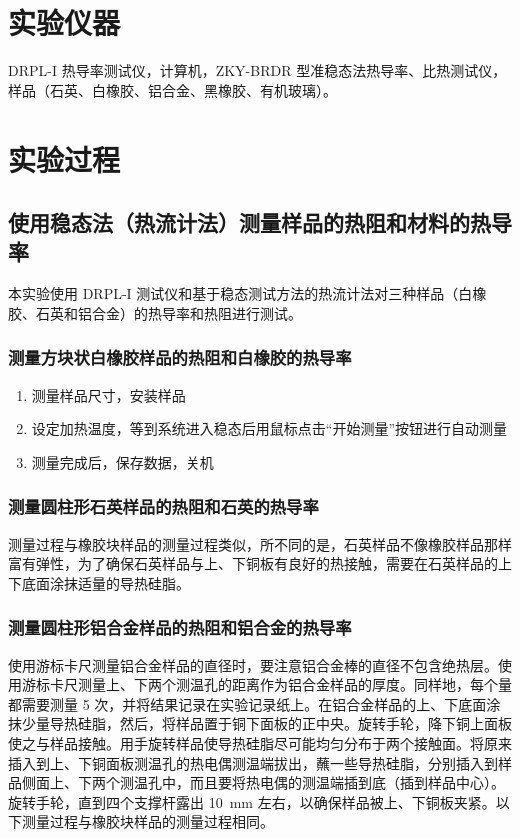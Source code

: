\section{实验仪器}%
    DRPL-I 热导率测试仪，计算机，ZKY-BRDR 型准稳态法热导率、比热测试仪，样品（石英、白橡胶、铝合金、黑橡胶、有机玻璃）。
    \section{实验过程}%
    \subsection{使用稳态法（热流计法）测量样品的热阻和材料的热导率}
    本实验使用 DRPL-I 测试仪和基于稳态测试方法的热流计法对三种样品（白橡胶、石英和铝合金）的热导率和热阻进行测试。
        \subsubsection{测量方块状白橡胶样品的热阻和白橡胶的热导率}
        \begin{enumerate}
            \item 测量样品尺寸，安装样品
            \item 设定加热温度，等到系统进入稳态后用鼠标点击“开始测量”按钮进行自动测量
            \item 测量完成后，保存数据，关机
        \end{enumerate}
        \subsubsection{测量圆柱形石英样品的热阻和石英的热导率}
        测量过程与橡胶块样品的测量过程类似，所不同的是，石英样品不像橡胶样品那样富有弹性，为了确保石英样品与上、下铜板有良好的热接触，需要在石英样品的上下底面涂抹适量的导热硅脂。
        \subsubsection{测量圆柱形铝合金样品的热阻和铝合金的热导率}
        使用游标卡尺测量铝合金样品的直径时，要注意铝合金棒的直径不包含绝热层。使用游标卡尺测量上、下两个测温孔的距离作为铝合金样品的厚度。同样地，每个量都需要测量 5 次，并将结果记录在实验记录纸上。在铝合金样品的上、下底面涂抹少量导热硅脂，然后，将样品置于铜下面板的正中央。旋转手轮，降下铜上面板使之与样品接触。用手旋转样品使导热硅脂尽可能均匀分布于两个接触面。将原来插入到上、下铜面板测温孔的热电偶测温端拔出，蘸一些导热硅脂，分别插入到样品侧面上、下两个测温孔中，而且要将热电偶的测温端插到底（插到样品中心）。旋转手轮，直到四个支撑杆露出 \SI{10}{\mm} 左右，以确保样品被上、下铜板夹紧。以下测量过程与橡胶块样品的测量过程相同。

